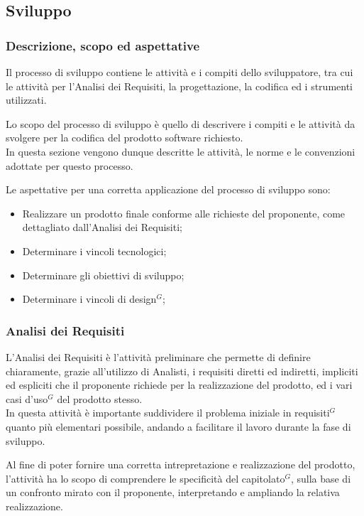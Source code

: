 \subsection{Sviluppo}

\subsubsection{Descrizione, scopo ed aspettative}

Il processo di sviluppo contiene le attività e i compiti dello sviluppatore, tra cui le attività per l’Analisi dei Requisiti, la progettazione, la codifica ed i strumenti utilizzati.

Lo scopo del processo di sviluppo è quello di descrivere i compiti e le attività da svolgere per la codifica del prodotto software richiesto. \\
In questa sezione vengono dunque descritte le attività, le norme e le convenzioni adottate per questo processo.

Le aspettative per una corretta applicazione del processo di sviluppo sono:
\begin{itemize}
    \item Realizzare un prodotto finale conforme alle richieste del proponente, come dettagliato dall'Analisi dei Requisiti;
    \item Determinare i vincoli tecnologici;
    \item Determinare gli obiettivi di sviluppo;
    \item Determinare i vincoli di design$^{G}$;
\end{itemize}
\subsubsection{Analisi dei Requisiti}


L’Analisi dei Requisiti è l’attività preliminare che permette di definire chiaramente, grazie all'utilizzo di Analisti, i requisiti diretti ed indiretti, 
impliciti ed espliciti che il proponente richiede per la realizzazione del prodotto, ed i vari casi d’uso$^{G}$ del prodotto stesso. \\
In questa attività è importante suddividere il problema iniziale in requisiti$^{G}$ quanto più elementari possibile, andando a facilitare il lavoro durante la fase di sviluppo.

Al fine di poter fornire una corretta intrepretazione e realizzazione del prodotto, l'attività ha lo scopo di comprendere le specificità del capitolato$^{G}$, sulla base di un confronto mirato con il proponente, interpretando e ampliando la relativa realizzazione.
\pagebreak
   
